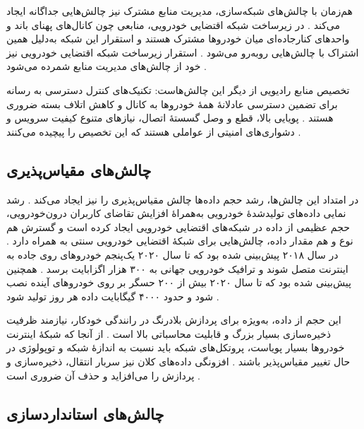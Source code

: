 هم‌زمان با چالش‌های شبکه‌سازی، مدیریت منابع مشترک نیز چالش‌هایی جداگانه ایجاد می‌کند \cite{hozouriOverviewVANETVehicular2023}. در زیرساخت شبکه اقتضایی خودرویی، منابعی چون کانال‌های پهنای باند و واحدهای کنارجاده‌ای  میان خودروها مشترک هستند و استقرار این شبکه به‌دلیل همین اشتراک با چالش‌هایی روبه‌رو می‌شود \cite{hozouriOverviewVANETVehicular2023}. استقرار زیرساخت شبکه اقتضایی خودرویی نیز خود از چالش‌های مدیریت منابع شمرده می‌شود \cite{hozouriOverviewVANETVehicular2023}.

تخصیص منابع رادیویی از دیگر این چالش‌هاست: تکنیک‌های کنترل دسترسی به رسانه  برای تضمین دسترسی عادلانهٔ همهٔ خودروها به کانال و کاهش اتلاف بسته ضروری هستند \cite{hozouriOverviewVANETVehicular2023}. پویایی بالا، قطع و وصل گسستهٔ اتصال، نیازهای متنوع کیفیت سرویس  و دشواری‌های امنیتی از عواملی هستند که این تخصیص را پیچیده می‌کنند \cite{hozouriOverviewVANETVehicular2023}.

\subsection{چالش‌های مقیاس‌پذیری}

در امتداد این چالش‌ها، رشد حجم داده‌ها چالش مقیاس‌پذیری را نیز ایجاد می‌کند \cite{xuInternetVehiclesBig2018}. رشد نمایی داده‌های تولیدشدهٔ خودرویی به‌همراهٔ افزایش تقاضای کاربران درون‌خودرویی، حجم عظیمی از داده در شبکه‌های اقتضایی خودرویی ایجاد کرده است و گسترش هم نوع و هم مقدار داده، چالش‌هایی برای شبکهٔ اقتضایی خودرویی سنتی به همراه دارد \cite{xuInternetVehiclesBig2018}. در سال ۲۰۱۸ پیش‌بینی شده بود که تا سال ۲۰۲۰ یک‌پنجم خودروهای روی جاده به اینترنت متصل شوند و ترافیک خودرویی جهانی به ۳۰۰ هزار اگزابایت برسد \cite{xuInternetVehiclesBig2018}. همچنین پیش‌بینی شده بود که تا سال ۲۰۲۰ بیش از ۲۰۰ حسگر بر روی خودروهای آینده نصب شود و حدود ۴۰۰۰ گیگابایت داده هر روز تولید شود \cite{xuInternetVehiclesBig2018}.

این حجم از داده، به‌ویژه برای پردازش بلادرنگ در رانندگی خودکار، نیازمند ظرفیت ذخیره‌سازی بسیار بزرگ و قابلیت محاسباتی بالا است \cite{xuInternetVehiclesBig2018}. از آنجا که شبکهٔ اینترنت خودروها  بسیار پویاست، پروتکل‌های شبکه باید نسبت به اندازهٔ شبکه و توپولوژی در حال تغییر مقیاس‌پذیر باشند \cite{xuInternetVehiclesBig2018}. افزونگی داده‌های کلان نیز سربار انتقال، ذخیره‌سازی و پردازش را می‌افزاید و حذف آن ضروری است \cite{xuInternetVehiclesBig2018}.

\subsection{چالش‌های استانداردسازی}

